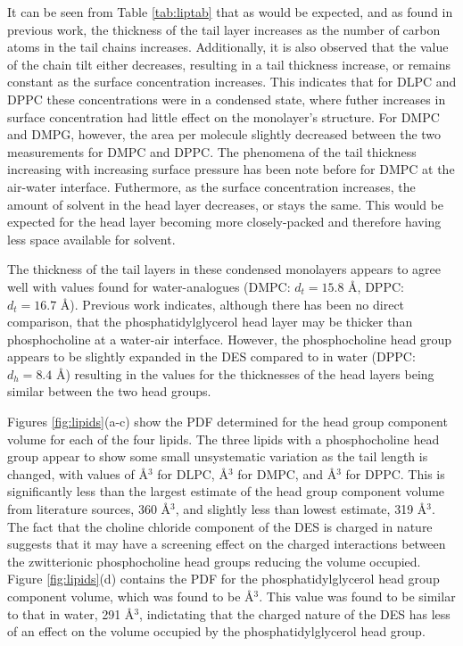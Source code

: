 \documentclass[twoside,twocolumn,9pt]{article}
\begin{document}
It can be seen from Table \ref{tab:liptab} that as would be expected, and as found in previous work,\cite{Mohwald1990,Vaknin1991} the thickness of the tail layer increases as the number of carbon atoms in the tail chains increases. Additionally, it is also observed that the value of the chain tilt either decreases, resulting in a tail thickness increase, or remains constant as the surface concentration increases. This indicates that for DLPC and DPPC these concentrations were in a condensed state, where futher increases in surface concentration had little effect on the monolayer's structure. For DMPC and DMPG, however, the area per molecule slightly decreased between the two measurements for DMPC and DPPC. The phenomena of the tail thickness increasing with increasing surface pressure has been note before for DMPC at the air-water interface.\cite{Bayerl1990} Futhermore, as the surface concentration increases, the amount of solvent in the head layer decreases, or stays the same. This would be expected for the head layer becoming more closely-packed and therefore having less space available for solvent. 

The thickness of the tail layers in these condensed monolayers appears to agree well with values found for water-analogues (DMPC: $d_t=15.8$ \AA,\cite{Johnson1991} DPPC: $d_t=16.7$ \AA\cite{Helm1987}). Previous work indicates, although there has been no direct comparison, that the phosphatidylglycerol head layer may be thicker than phosphocholine at a water-air interface.\cite{Clifton2012,Johnson1991,Vaknin1991,Lawrie2000} However, the phosphocholine head group appears to be slightly expanded in the DES compared to in water (DPPC: $d_h=8.4$ \AA\cite{Helm1987}) resulting in the values for the thicknesses of the head layers being similar between the two head groups. 

Figures \ref{fig:lipids}(a-c) show the PDF determined for the head group component volume for each of the four lipids. The three lipids with a phosphocholine head group appear to show some small unsystematic variation as the tail length is changed, with values of  \AA$^{3}$ for DLPC,  \AA$^{3}$ for DMPC, and  \AA$^{3}$ for DPPC. This is significantly less than the largest estimate of the head group component volume from literature sources, 360 \AA$^3$,\cite{Tardieu1973} and slightly less than lowest estimate, 319 \AA$^3$.\cite{Sun1994,Kucerka2004} The fact that the choline chloride component of the DES is charged in nature suggests that it may have a screening effect on the charged interactions between the zwitterionic phosphocholine head groups reducing the volume occupied. Figure \ref{fig:lipids}(d) contains the PDF for the phosphatidylglycerol head group component volume, which was found to be  \AA$^{3}$. This value was found to be similar to that in water, 291 \AA$^{3}$,\cite{Pan2012} indictating that the charged nature of the DES has less of an effect on the volume occupied by the phosphatidylglycerol head group. 
\end{document}
